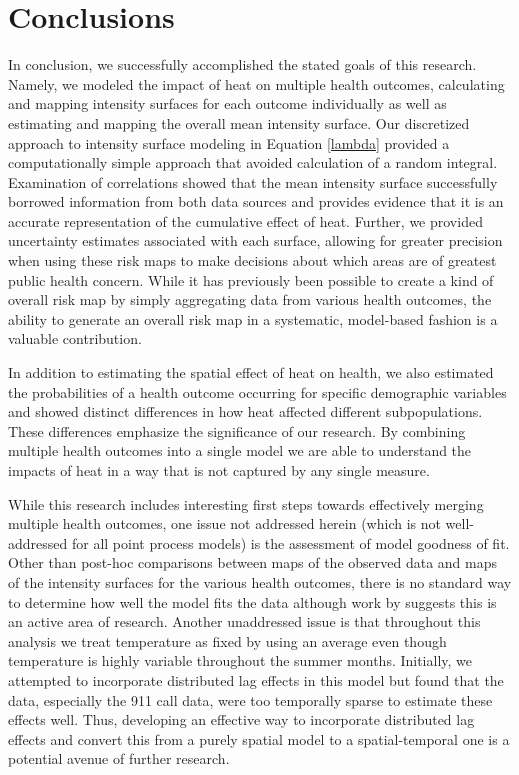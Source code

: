 \documentclass[final]{statsoc}
\begin{document}
\section{Conclusions}
In conclusion, we successfully accomplished the stated goals of this research. Namely, we modeled the impact of heat on multiple health outcomes, calculating and mapping intensity surfaces for each outcome individually as well as estimating and mapping the overall mean intensity surface. Our discretized approach to intensity surface modeling in Equation \eqref{lambda} provided a computationally simple approach that avoided calculation of a random integral.  Examination of correlations showed that the mean intensity surface successfully borrowed information from both data sources and provides evidence that it is an accurate representation of the cumulative effect of heat. Further, we provided uncertainty estimates associated with each surface, allowing for greater precision when using these risk maps to make decisions about which areas are of greatest public health concern. While it has previously been possible to create a kind of overall risk map by simply aggregating data from various health outcomes, the ability to generate an overall risk map in a systematic, model-based fashion is a valuable contribution. 

In addition to estimating the spatial effect of heat on health, we also estimated the probabilities of a health outcome occurring for specific demographic variables and showed distinct differences in how heat affected different subpopulations. These differences emphasize the significance of our research. By combining multiple health outcomes into a single model we are able to understand the impacts of heat in a way that is not captured by any single measure. 

While this research includes interesting first steps towards effectively merging multiple health outcomes, one issue not addressed herein (which is not well-addressed for all point process models) is the assessment of model goodness of fit. Other than post-hoc comparisons between maps of the observed data and maps of the intensity surfaces for the various health outcomes, there is no standard way to determine how well the model fits the data although work by \citet{leininger2014bayesian} suggests this is an active area of research. Another unaddressed issue is that throughout this analysis we treat temperature as fixed by using an average even though temperature is highly variable throughout the summer months. Initially, we attempted to incorporate distributed lag effects \citep{Heaton2012} in this model but found that the data, especially the 911 call data, were too temporally sparse to estimate these effects well.  Thus, developing an effective way to incorporate distributed lag effects and convert this from a purely spatial model to a spatial-temporal one is a potential avenue of further research. 
\end{document}
